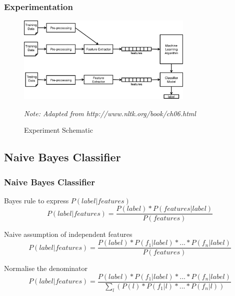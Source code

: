 \documentclass{beamer}
\begin{document}

\begin{frame}
\frametitle{Experimentation}

\begin{figure}[h]
\centering
\includegraphics[width=0.75\textwidth]{img/schematic.png}
\caption{Experiment Schematic}
\tiny{\textit{Note: Adapted from http://www.nltk.org/book/ch06.html}}
\label{fig:schematic}
\end{figure}

\end{frame}

\subsection{Naive Bayes Classifier}

\begin{frame}
\frametitle{Naive Bayes Classifier}

Bayes rule to express $P(label|features)$
\begin{equation}
P(label|features)
	= \frac	{P(label) * P(features|label)}
			{P(features)}
\end{equation}

Naive assumption of independent features
\begin{equation}
P(label|features)
	= \frac	{P(label) * P(f_1|label) * ... * P(f_n|label)}
			{P(features)}
\end{equation}

Normalise the denominator
\begin{equation}
P(label|features)
	= \frac	{P(label) * P(f_1|label) * ... * P(f_n|label)}
			{\sum_l( P(l) * P(f_1|l) * ... * P(f_n|l) )}
\end{equation}

\end{frame}

\end{document}
